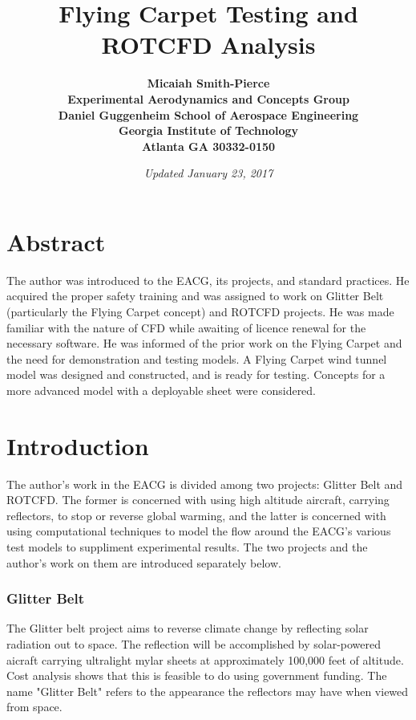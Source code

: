 \documentclass[12pt]{report} %
\title{\bf Flying Carpet Testing and ROTCFD Analysis\\  }
\author{\bf Micaiah Smith-Pierce
\\ Experimental Aerodynamics and Concepts Group
\\Daniel Guggenheim School of Aerospace Engineering
\\Georgia Institute of Technology
\\Atlanta GA 30332-0150
}
\date{\it Updated January 23, 2017} %
\begin{document}
\maketitle
 
\tableofcontents
 
\chapter{Abstract}

The author was introduced to the EACG, its projects, and standard practices.  He acquired the proper safety training and
was assigned to work on Glitter Belt (particularly the Flying Carpet concept) and ROTCFD projects.  He was made familiar
with the nature of CFD while awaiting of licence renewal for the necessary software.  He was informed of the prior work on
the Flying Carpet and the need for demonstration and testing models.  A Flying Carpet wind tunnel model was designed and
constructed, and is ready for testing.  Concepts for a more advanced model with a deployable sheet were considered.

\chapter{Introduction}

The author's work in the EACG is divided among two projects: Glitter Belt and ROTCFD.  The former is concerned with using high
altitude aircraft, carrying reflectors, to stop or reverse global warming, and the latter is concerned with using computational
techniques to model the flow around
the EACG's various test models to suppliment experimental results.  The two projects and the author's work on them are introduced
separately below.

\subsection{Glitter Belt}

The Glitter belt project aims to reverse climate change by reflecting solar radiation out to space.  The reflection will be accomplished
by solar-powered aicraft carrying ultralight mylar sheets at approximately 100,000 feet of altitude.  Cost analysis shows that this is
feasible to do using government funding.  The name "Glitter Belt" refers to the appearance the reflectors may have when viewed from space.
\end{document}
